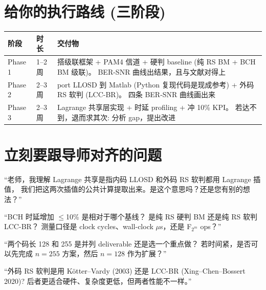 \documentclass[11pt,a4paper]{article}
\begin{document}
\section{给你的执行路线 (三阶段)}

\begin{table}[h!]
\centering
\begin{tabularx}{\textwidth}{llX}
\toprule
\textbf{阶段} & \textbf{时长} & \textbf{交付物} \\
\midrule
Phase 1 & 1--2 周 &
搭级联框架 + PAM4 信道 + 硬判 baseline (纯 RS BM + BCH BM 级联)。
BER-SNR 曲线出结果，且与文献对得上 \\
\midrule
Phase 2 & 2--3 周 &
port LLOSD 到 Matlab (Python 复现代码是现成参考) + 外码 RS 软判 (LCC-BR)。
四条 BER-SNR 曲线画出来 \\
\midrule
Phase 3 & 2--3 周 &
Lagrange 共享层实现 + 时延 profiling + 冲 10\% KPI。
若达不到，退而求其次: 分析 gap，提出改进 \\
\bottomrule
\end{tabularx}
\end{table}

\section{立刻要跟导师对齐的问题}

\begin{actionbox}[title=\textbf{Q1. 技术路线确认}]
``老师，我理解 Lagrange 共享是指内码 LLOSD 和外码 RS 软判都用 Lagrange 插值，
我们把这两次插值的公共计算提取出来。是这个意思吗？还是您有别的想法？''
\end{actionbox}

\begin{actionbox}[title=\textbf{Q2. 时延 KPI 基线}]
``BCH 时延增加 $\leq$10\% 是相对于哪个基线？
是纯 RS 硬判 BM 还是纯 RS 软判 LCC-BR？
测量口径是 clock cycles、wall-clock $\mu$s，还是 F$_{2^m}$ ops？''
\end{actionbox}

\begin{actionbox}[title=\textbf{Q3. 工作量范围}]
``两个码长 128 和 255 是并列 deliverable 还是选一个重点做？
若时间紧，是否可以先完成 $n=255$ 方案，然后 $n=128$ 作为扩展？''
\end{actionbox}

\begin{actionbox}[title=\textbf{Q4. RS 软判具体算法}]
``外码 RS 软判是用 Kötter--Vardy (2003) 还是 LCC-BR (Xing--Chen--Bossert 2020)?
后者更适合硬件、复杂度更低，但两者性能不一样。''
\end{actionbox}
\end{document}

